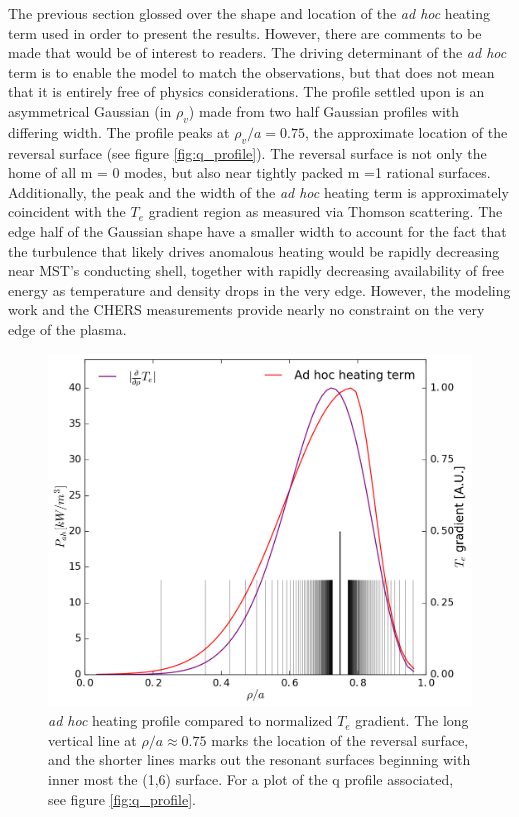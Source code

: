 The previous section glossed over the shape and location of the \textit{ad hoc} heating term used in order to present the results. However, there are comments to be made that would be of interest to readers. The driving determinant of the \textit{ad hoc} term is to enable the model to match the observations, but that does not mean that it is entirely free of physics considerations. The profile settled upon is an asymmetrical Gaussian (in $\rho_v$) made from two half Gaussian profiles with differing width. The profile peaks at $\rho_v/a = 0.75$, the approximate location of the reversal surface (see figure \ref{fig:q_profile}). The reversal surface is not only the home of all m = 0 modes, but also near tightly packed m =1 rational surfaces. Additionally, the peak and the width of the \textit{ad hoc} heating term is approximately coincident with the $T_e$ gradient region as measured via Thomson scattering. The edge half of the Gaussian shape have a smaller width to account for the fact that the turbulence that likely drives anomalous heating would be rapidly decreasing near MST's conducting shell, together with rapidly decreasing availability of free energy as temperature and density drops in the very edge. However, the modeling work and the CHERS measurements provide nearly no constraint on the very edge of the plasma. 
\begin{figure}
    \centering
    \includegraphics[width = \textwidth]{ion_transport_results/adhoc_profile.png}
    \caption[\textit{ad hoc} heating profile]{\textit{ad hoc} heating profile compared to normalized $T_e$  gradient. The long vertical line at $\rho/a \approx 0.75$ marks the location of the reversal surface, and the shorter lines marks out the resonant surfaces beginning with inner most the (1,6) surface. For a plot of the q profile associated, see figure \ref{fig:q_profile}.}
    \label{fig:ad_hoc_v_gradient}
\end{figure}
